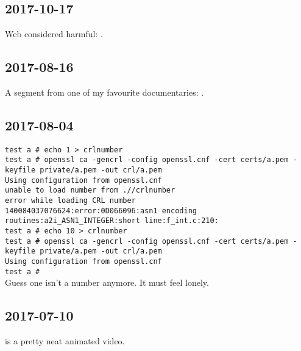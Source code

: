 \documentclass{article}
\begin{document}
\subsection{2017-10-17}
Web considered harmful: .

\subsection{2017-08-16}
A segment from one of my favourite documentaries: .

\subsection{2017-08-04}
\texttt{test a # echo 1 > crlnumber \\
test a # openssl ca -gencrl -config openssl.cnf -cert certs/a.pem -keyfile private/a.pem -out crl/a.pem \\
Using configuration from openssl.cnf \\
unable to load number from .//crlnumber \\
error while loading CRL number \\
140084037076624:error:0D066096:asn1 encoding routines:a2i_ASN1_INTEGER:short line:f_int.c:210: \\
test a # echo 10 > crlnumber \\
test a # openssl ca -gencrl -config openssl.cnf -cert certs/a.pem -keyfile private/a.pem -out crl/a.pem \\
Using configuration from openssl.cnf \\
test a #} \\
Guess one isn't a number anymore.  It must feel lonely.

\subsection{2017-07-10}
 is a pretty neat animated video.
\end{document}
